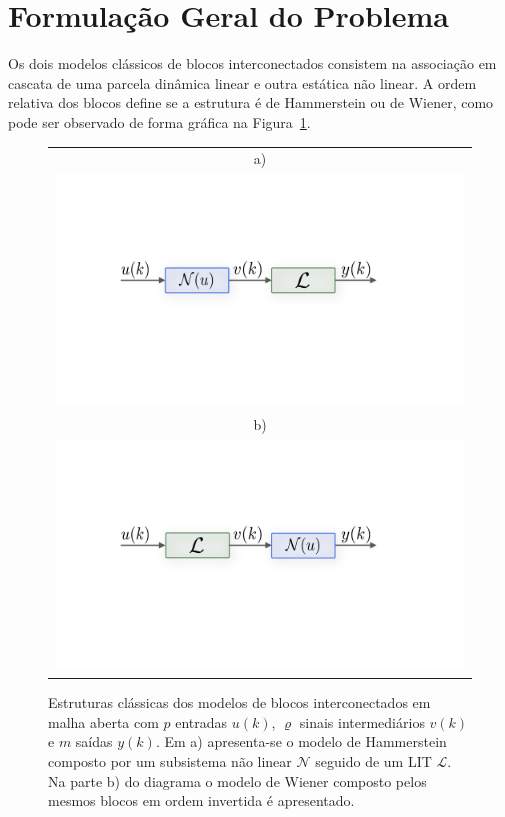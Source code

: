 \section{Formulação Geral do Problema} 
\label{sec:intro_problema}
%
\par 
Os dois modelos clássicos de blocos interconectados consistem na associação em cascata de uma parcela dinâmica linear e outra estática não linear. A ordem relativa dos blocos define se a estrutura é de Hammerstein ou de Wiener, como pode ser observado de forma gráfica na Figura~\ref{fig:cap1modhamwin}.
%
\begin{figure}[h]
	\centering
	\begin{tabular}{c}
		a) \\
		\includegraphics[scale=0.4,trim=0mm 80mm 8mm 65mm,clip=true]{figuras/ham_ger} \\
		b) \\
		\includegraphics[scale=0.4,trim=0mm 80mm 8mm 65mm,clip=true]{figuras/wie_ger}
	\end{tabular}
	\caption[Estruturas clássicas dos modelos de blocos interconectados em malha aberta.]{Estruturas clássicas dos modelos de blocos interconectados em malha aberta com $p$ entradas $u(k)$, $\varrho$ sinais intermediários $v(k)$ e $m$ saídas $y(k)$. Em a) apresenta-se o modelo de Hammerstein composto por um subsistema não linear $\mathcal{N}$ seguido de um \acs{LIT} $\mathcal{L}$. Na parte b) do diagrama o modelo de Wiener composto pelos mesmos blocos em ordem invertida é apresentado.}
	\label{fig:cap1modhamwin}	
\end{figure}
